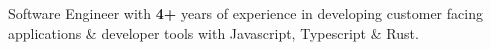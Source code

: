 \documentclass[9pt]{developercv} %
\begin{document}
\vspace{0.5cm}


\cvsect{}

\begin{minipage}[t]{0.4\textwidth} %
	\vspace{-\baselineskip} %
	
	Software Engineer with \textbf{4+} years of experience in developing customer facing applications \& developer tools with Javascript, Typescript \& Rust. 
\end{minipage}
\hfill %
\begin{minipage}[t]{0.5\textwidth} %
	\vspace{-\baselineskip} %
\end{minipage}




\end{document}
